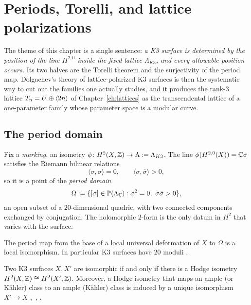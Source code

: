 \chapter{Periods, Torelli, and lattice polarizations}\label{ch:torelli}

The theme of this chapter is a single sentence: \emph{a K3 surface is
determined by the position of the line $H^{2,0}$ inside the fixed lattice
$\Lambda_{K3}$, and every allowable position occurs.} Its two halves are the
Torelli theorem and the surjectivity of the period map. Dolgachev's theory of
lattice-polarized K3 surfaces is then the systematic way to cut out the
families one actually studies, and it produces the rank-3 lattice
$T_n=U\oplus\langle 2n\rangle$ of Chapter~\ref{ch:lattices} as the transcendental
lattice of a one-parameter family whose parameter space is a modular curve.

\section{The period domain}

Fix a \emph{marking}, an isometry $\phi\colon H^2(X,\mathbb{Z})\to\Lambda:=\Lambda_{K3}$.
The line $\phi(H^{2,0}(X))=\mathbb{C}\sigma$ satisfies the Riemann bilinear relations
\[
  \langle\sigma,\sigma\rangle=0,\qquad\langle\sigma,\bar\sigma\rangle>0 ,
\]
so it is a point of the \emph{period domain}
\[
  \Omega:=\{[\sigma]\in\PP(\Lambda_\C):\sigma^2=0,\ \sigma\bar\sigma>0\},
\]
an open subset of a $20$-dimensional quadric, with two connected components
exchanged by conjugation. The holomorphic $2$-form is the only datum in
$H^2$ that varies with the surface.

\begin{theorem}
The period map from the base of a local universal deformation of $X$ to
$\Omega$ is a local isomorphism. In particular K3 surfaces have $20$ moduli
\cite[Ch.~6, Prop.~2.8]{Huybrechts2016}.
\end{theorem}

\begin{theorem}\label{thm:torelli}
Two K3 surfaces $X,X'$ are isomorphic if and only if there is a Hodge isometry
$H^2(X,\mathbb{Z})\cong H^2(X',\mathbb{Z})$. Moreover, a Hodge isometry that maps an ample
(or K\"ahler) class to an ample (K\"ahler) class is induced by a unique
isomorphism $X'\to X$
\cite{PiatetskiShapiroShafarevich1971},~\cite{BurnsRapoport1975},
\cite[Thm.~7.5.3]{Huybrechts2016}.
\end{theorem}

